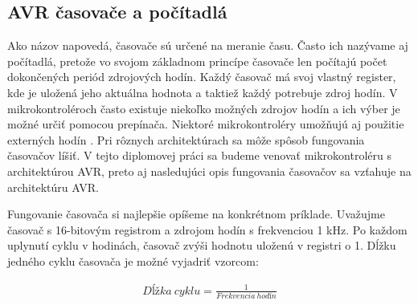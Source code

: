 \setcounter{tocdepth}{4}
\setcounter{secnumdepth}{4}

\subsection{AVR časovače a počítadlá}
\noindent

Ako názov napovedá, časovače sú určené na meranie času. Často ich nazývame aj počítadlá,
pretože vo svojom základnom princípe časovače len počítajú počet dokončených periód zdrojových hodín.
Každý časovač má svoj vlastný register, kde je uložená jeho aktuálna hodnota a taktiež každý potrebuje zdroj hodín. V mikrokontroléroch často existuje niekoľko možných zdrojov
hodín a ich výber je možné určiť pomocou prepínača. Niektoré mikrokontroléry umožňujú aj použitie
externých hodín \cite{IntroductionMicrocontrollerTimers}. Pri rôznych architektúrach sa môže spôsob fungovania časovačov líšiť. V tejto diplomovej práci sa budeme venovať
mikrokontroléru s architektúrou AVR, preto aj nasledujúci opis fungovania časovačov sa vzťahuje na architektúru AVR.\par
Fungovanie časovača si najlepšie opíšeme na konkrétnom príklade.
Uvažujme časovač s 16-bitovým registrom a zdrojom hodín s frekvenciou 1 \acrshort{kHz}. Po každom uplynutí cyklu v hodinách, časovač
zvýši hodnotu uloženú v registri o 1. Dĺžku jedného cyklu časovača je možné vyjadriť vzorcom:

\begin{equation}
    \begin{aligned}
        Dĺžka\:cyklu = \frac{1}{Frekvencia\:hodín}
    \end{aligned}
\end{equation}

